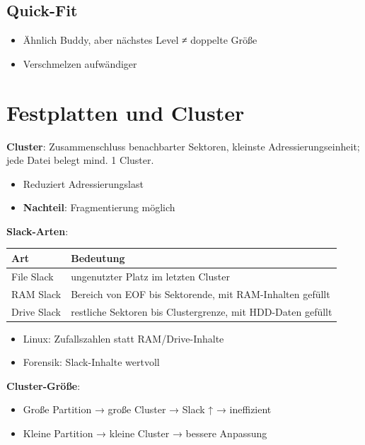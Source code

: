 \documentclass[11pt, a4paper]{article}
\begin{document}
\subsection{Quick-Fit}
\begin{itemize}
  \item Ähnlich Buddy, aber nächstes Level ≠ doppelte Größe
  \item Verschmelzen aufwändiger
\end{itemize}


\section{Festplatten und Cluster}

\textbf{Cluster}: Zusammenschluss benachbarter Sektoren, kleinste Adressierungseinheit; jede Datei belegt mind. 1 Cluster.

\begin{itemize}
  \item Reduziert Adressierungslast
  \item \textbf{Nachteil}: Fragmentierung möglich
\end{itemize}

\textbf{Slack-Arten}:


{\small
\begin{tabularx}{\linewidth}{XX}
\hline
\rowcolor{tableheadbg}
{\color{white}\textbf{Art}} & {\color{white}\textbf{Bedeutung}} \\[2pt]
\hline
\endhead
\hline
\endfoot
File Slack & ungenutzter Platz im letzten Cluster \\
RAM Slack & Bereich von EOF bis Sektorende, mit RAM-Inhalten gefüllt \\
Drive Slack & restliche Sektoren bis Clustergrenze, mit HDD-Daten gefüllt \\
\end{tabularx}
}


\begin{itemize}
  \item Linux: Zufallszahlen statt RAM/Drive-Inhalte
  \item Forensik: Slack-Inhalte wertvoll
\end{itemize}

\textbf{Cluster-Größe}:

\begin{itemize}
  \item Große Partition → große Cluster → Slack ↑ → ineffizient
  \item Kleine Partition → kleine Cluster → bessere Anpassung
\end{itemize}
\end{document}
